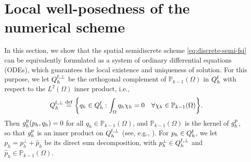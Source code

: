 \documentclass[11pt,reqno]{amsart}
\theoremstyle{definition}
\theoremstyle{plain}
\numberwithin{theorem}{section}
\numberwithin{proposition}{section}
\numberwithin{lemma}{section}
\numberwithin{equation}{section}
\newcommand{\bs}[1]{\boldsymbol{#1}}
\newcommand{\uu}[1]  {{\bs{#1}} }
\newcommand{\grad}   { \uu{\nabla}    }
\newcommand{\bu}{\uu{u}}
\renewcommand{\(}{\bigl(}
\renewcommand{\)}{\bigr)}
\def\eqd{\stackrel{\mathrm{def}}{=}}
\begin{document}
\appendix 



\section{Local well-posedness of the numerical scheme}
\label{section:wellposed}

In this section, we show that the spatial semidiscrete scheme  \eqref{eq:discrete-semi-fsi} can be equivalently formulated as a system of ordinary differential equations (ODEs), which guarantees the local existence and uniqueness of solution. For this purpose, we let $Q_h^{\rm f,\perp}$ be the orthogonal complement of $\mathbb{P}_{k-1}(\Omega)$ in $Q_h^{\rm f}$ with respect to the $L^2(\Omega)$ inner product, i.e., 
$$
Q_h^{\rm f,\perp} \eqd  \bigg\{ q_h\in Q_h^{\rm f}:
\int_{\Omega} q_h\chi_h= 0
\quad \forall  \chi_h\in \mathbb{P}_{k-1}(\Omega) \bigg\} .
$$
Then $g_h^{\rm p} (p_h,q_h)=0$ for all $q_h\in \mathbb{P}_{k-1}(\Omega) $, and $\mathbb{P}_{k-1}(\Omega)$ is the kernel of $g_h^{\rm p}$, so that $g_h^{\rm p}$ is an inner product on $Q_h^{\rm f,\perp}$ (see, e.g., \cite{burman-10,massing-et-al-14,GuzmOlsh}).  For $p_h \in Q_h^{\rm f}$, we let $p_h= p_h^\perp + \hat p_h$ be its direct sum decomposition, with $p_h^\perp\in Q_h^{\rm f,\perp}$ and $\hat p_h\in \mathbb{P}_{k-1}(\Omega) $. 
\end{document}
